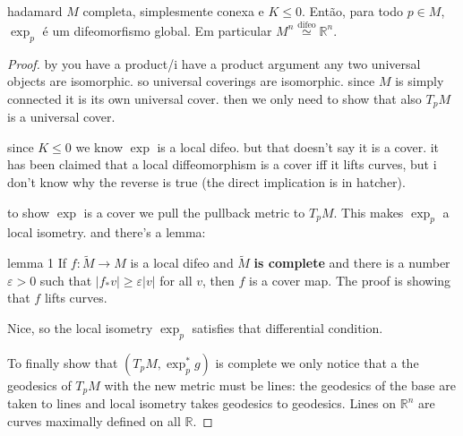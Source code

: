 \begin{thing6}{hadamard}\leavevmode
\(M\) completa, simplesmente conexa e \(K \leq  0\). Então, para todo \(p \in M\), \(\operatorname{exp}_p\) é um difeomorfismo global. Em particular \(M^n \overset{\operatorname{difeo}}{\simeq} \mathbb{R}^n\).
\end{thing6}

\begin{proof}\leavevmode
by you have a product/i have a product argument any two universal objects are isomorphic. so universal coverings are isomorphic. since \(M\) is simply connected it is its own universal cover. then we only need to show that also \(T_pM\) is a universal cover.

since \(K\leq 0\) we know \(\operatorname{exp}\) is a local difeo. but that doesn't say it is a cover. it has been claimed that a local diffeomorphism is a cover iff it lifts curves, but i don't know why the reverse is true (the direct implication is in hatcher).

to show \(\operatorname{exp}\) is a cover we pull the pullback metric to \(T_pM\). This makes \(\operatorname{exp}_p\) a local isometry. and there's a lemma:

\begin{thing6}{lemma 1}\leavevmode
If \(f:\tilde{M} \to M\) is a local difeo and \(\tilde{M}\) \textbf{is complete} and there is a number \(\varepsilon>0\) such that \(|f_*v|\geq \varepsilon|v|\) for all \(v\), then \(f\) is a cover map. The proof is showing that \(f\) lifts curves.
\end{thing6}
Nice, so the local isometry \(\operatorname{exp}_p\) satisfies that differential condition.

To finally show that \((T_pM, \operatorname{exp}_p ^*g)\) is complete we only notice that a the geodesics of \(T_pM\) with the new metric must be lines: the geodesics of the base are taken to lines and local isometry takes geodesics to geodesics. Lines on \(\mathbb{R}^n\) are curves maximally defined on all \(\mathbb{R}\).
\end{proof}

